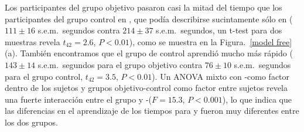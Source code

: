 
Los participantes del grupo objetivo pasaron casi la mitad del tiempo que los participantes del grupo control en \testa, que podía describirse sucintamente sólo en \gramboolxor ($111\pm16$ s.e.m.\ segundos contra $214\pm37$ s.e.m.\ segundos, un t-test para dos muestras revela $t_{42}=2.6$, $P<0.01$), como se muestra en la Figura.~\ref{model free} (a). También encontramos que el grupo de control aprendió mucho más rápido \testb ($143\pm14$ s.e.m.\ segundos para el grupo objetivo contra $76\pm10$ s.e.m.\ segundos para el grupo control, $t_{42}=3.5$, $P<0.01$). Un ANOVA mixto con \testa-\testb como factor dentro de los sujetos y grupos objetivo-control como factor entre sujetos revela una fuerte interacción entre el grupo y \testa-\testb ($F=15.3$, $P<0.001$), lo que indica que las diferencias en el aprendizaje de los tiempos para \testa y \testb fueron muy diferentes entre los dos grupos.


